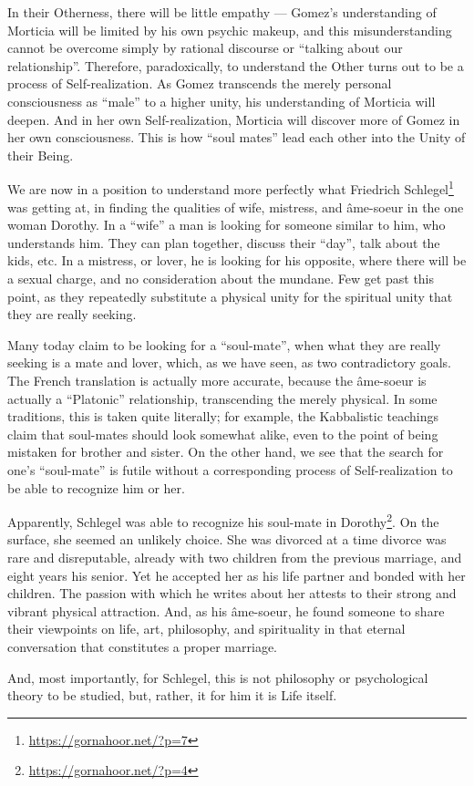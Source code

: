 In their Otherness, there will be little empathy --- Gomez's understanding of Morticia will be limited by his own psychic makeup, and this misunderstanding cannot be overcome simply by rational discourse or ``talking about our relationship''. Therefore, paradoxically, to understand the Other turns out to be a process of Self-realization. As Gomez transcends the merely personal consciousness as ``male'' to a higher unity, his understanding of Morticia will deepen. And in her own Self-realization, Morticia will discover more of Gomez in her own consciousness. This is how ``soul mates'' lead each other into the Unity of their Being.

We are now in a position to understand more perfectly what Friedrich Schlegel\footnote{\url{https://gornahoor.net/?p=7}} was getting at, in finding the qualities of wife, mistress, and âme-soeur in the one woman Dorothy. In a ``wife'' a man is looking for someone similar to him, who understands him. They can plan together, discuss their ``day'', talk about the kids, etc. In a mistress, or lover, he is looking for his opposite, where there will be a sexual charge, and no consideration about the mundane. Few get past this point, as they repeatedly substitute a physical unity for the spiritual unity that they are really seeking.

Many today claim to be looking for a ``soul-mate'', when what they are really seeking is a mate and lover, which, as we have seen, as two contradictory goals. The French translation is actually more accurate, because the âme-soeur is actually a ``Platonic'' relationship, transcending the merely physical. In some traditions, this is taken quite literally; for example, the Kabbalistic teachings claim that soul-mates should look somewhat alike, even to the point of being mistaken for brother and sister. On the other hand, we see that the search for one's ``soul-mate'' is futile without a corresponding process of Self-realization to be able to recognize him or her.

Apparently, Schlegel was able to recognize his soul-mate in Dorothy\footnote{\url{https://gornahoor.net/?p=4}}. On the surface, she seemed an unlikely choice. She was divorced at a time divorce was rare and disreputable, already with two children from the previous marriage, and eight years his senior. Yet he accepted her as his life partner and bonded with her children. The passion with which he writes about her attests to their strong and vibrant physical attraction. And, as his âme-soeur, he found someone to share their viewpoints on life, art, philosophy, and spirituality in that eternal conversation that constitutes a proper marriage.

And, most importantly, for Schlegel, this is not philosophy or psychological theory to be studied, but, rather, it for him it is Life itself.



